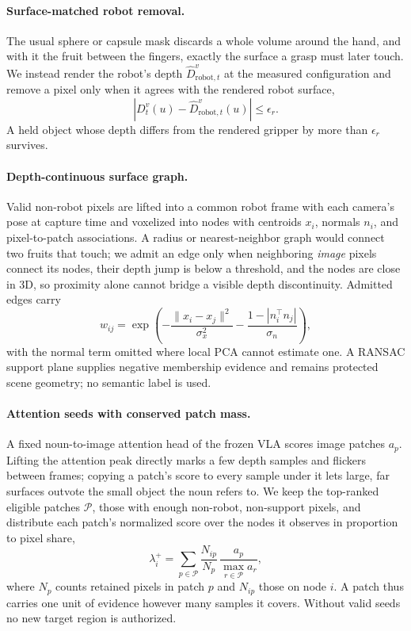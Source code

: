 \paragraph{Surface-matched robot removal.}
The usual sphere or capsule mask discards a whole volume around the hand, and with it the fruit between the fingers, exactly the surface a grasp must later touch. We instead render the robot's depth $\widehat D^v_{\mathrm{robot},t}$ at the measured configuration and remove a pixel only when it agrees with the rendered robot surface,
\begin{equation}
 |D_t^v(u)-\widehat D^v_{\mathrm{robot},t}(u)|\leq\epsilon_r .
 \label{eq:selfmask}
\end{equation}
A held object whose depth differs from the rendered gripper by more than $\epsilon_r$ survives.

\paragraph{Depth-continuous surface graph.}
Valid non-robot pixels are lifted into a common robot frame with each camera's pose at capture time and voxelized into nodes with centroids $x_i$, normals $n_i$, and pixel-to-patch associations. A radius or nearest-neighbor graph would connect two fruits that touch; we admit an edge only when neighboring \emph{image} pixels connect its nodes, their depth jump is below a threshold, and the nodes are close in 3D, so proximity alone cannot bridge a visible depth discontinuity. Admitted edges carry
\begin{equation}
 w_{ij}=\exp\!\left(-\frac{\|x_i-x_j\|^2}{\sigma_x^2}
 -\frac{1-|n_i^\top n_j|}{\sigma_n}\right),
 \label{eq:affinity}
\end{equation}
with the normal term omitted where local PCA cannot estimate one. A RANSAC support plane supplies negative membership evidence and remains protected scene geometry; no semantic label is used.

\paragraph{Attention seeds with conserved patch mass.}
A fixed noun-to-image attention head of the frozen VLA scores image patches $a_p$. Lifting the attention peak directly marks a few depth samples and flickers between frames; copying a patch's score to every sample under it lets large, far surfaces outvote the small object the noun refers to. We keep the top-ranked eligible patches $\mathcal P$, those with enough non-robot, non-support pixels, and distribute each patch's normalized score over the nodes it observes in proportion to pixel share,
\begin{equation}
 \lambda_i^+=\sum_{p\in\mathcal P}\frac{N_{ip}}{N_p}\,
 \frac{a_p}{\max_{r\in\mathcal P}a_r},
 \label{eq:mass}
\end{equation}
where $N_p$ counts retained pixels in patch $p$ and $N_{ip}$ those on node $i$. A patch thus carries one unit of evidence however many samples it covers. Without valid seeds no new target region is authorized.

